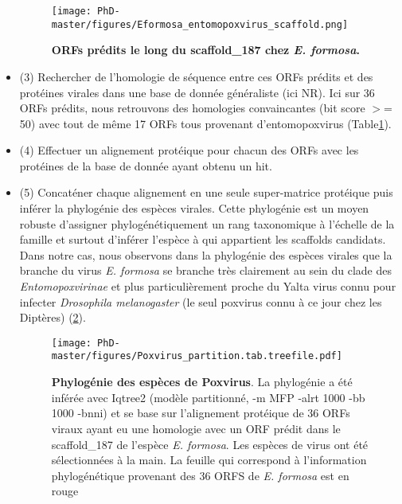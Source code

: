 \begin{itemize}
\begin{figure}[!htbp]
 \centering
  \texttt{[image: PhD-master/figures/Eformosa\_entomopoxvirus\_scaffold.png]}
\caption[Perspective:ORFs prédits le long du scaffold\_187 chez \textit{E. formosa}]{\textbf{ORFs prédits le long du scaffold\_187 chez \textit{E. formosa}.}}
\label{figure:Eformosa_entomopoxvirus_scaffold}
\end{figure}

 \item (3) Rechercher de l'homologie de séquence entre ces ORFs prédits et des protéines virales dans une base de donnée généraliste (ici NR). Ici sur 36 ORFs prédits, nous retrouvons des homologies convaincantes (bit score $>$= 50) avec tout de même 17 ORFs tous provenant d'entomopoxvirus (Table\ref{figure:Eformosa_entomopoxvirus_scaffold}). 

 \item (4) Effectuer un alignement protéique pour chacun des ORFs avec les protéines de la base de donnée ayant obtenu un hit. 

 \item (5) Concaténer chaque alignement en une seule super-matrice protéique puis inférer la phylogénie des espèces virales. Cette phylogénie est un moyen robuste d'assigner phylogénétiquement un rang taxonomique à l'échelle de la famille et surtout d'inférer l'espèce à qui appartient les scaffolds candidats. Dans notre cas, nous observons dans la phylogénie des espèces virales que la branche du virus \textit{E. formosa} se branche très clairement au sein du clade des \textit{Entomopoxvirinae} et plus particulièrement proche du Yalta virus connu pour infecter \textit{Drosophila melanogaster} \citep{wallace_discovery_2021} (le seul poxvirus connu à ce jour chez les Diptères) (\figurename{\ref{figure:Poxvirus_partition.tab.treefile}}). 
 
 \begin{figure}[!htbp]
 \centering
  \texttt{[image: PhD-master/figures/Poxvirus\_partition.tab.treefile.pdf]}
\caption[Perspective:Phylogénie des espèces de Poxvirus incluant \textit{E.formosa} entomopoxvirus]{\textbf{Phylogénie des espèces de Poxvirus}. La phylogénie a été inférée avec Iqtree2 (modèle partitionné, -m MFP -alrt 1000  -bb 1000 -bnni) et se base sur l'alignement protéique de 36 ORFs viraux ayant eu une homologie avec un ORF prédit dans le scaffold\_187 de l'espèce \textit{E. formosa}. Les espèces de virus ont été sélectionnées à la main. La feuille qui correspond à l'information phylogénétique provenant des 36 ORFS de \textit{E. formosa} est en rouge}
\label{figure:Poxvirus_partition.tab.treefile}
\end{figure}


\end{itemize}


